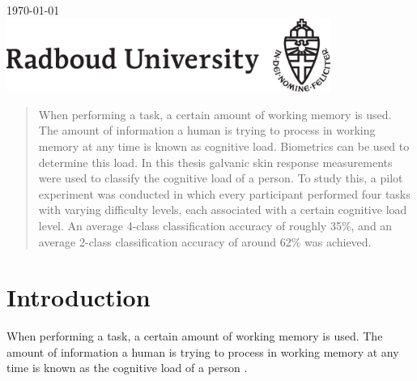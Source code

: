 \documentclass[11pt,leqno,a4paper]{report} %
\begin{document}
\begin{titlepage}

{\large \today}\\[3cm] %


\includegraphics[width=300pt]{radlogo.jpg}%
 

\vfill %

\end{titlepage}


\tableofcontents 
\thispagestyle{empty}
\addcontentsline



\begin{abstract}
When performing a task, a certain amount of working memory is used. The amount of information a human is trying to process in working memory at any time is known as cognitive load. Biometrics can be used to determine this load. In this thesis galvanic skin response measurements were used to classify the cognitive load of a person. To study this, a pilot experiment was conducted in which every participant performed four tasks with varying difficulty levels, each associated with a certain cognitive load level. An average 4-class classification accuracy of roughly 35\%, and an average 2-class classification accuracy of around 62\% was achieved.

\end{abstract}


\chapter{Introduction}
When performing a task, a certain amount of working memory is used. The amount of information a human is trying to process in working memory at any time is known as the cognitive load of a person \citep{Oviatt2004}. 
\end{document}
